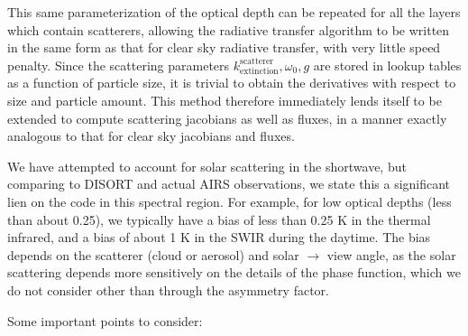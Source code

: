 \documentclass[11pt]{article}
\newcommand{\disort}{\textsf{DISORT}\xspace}
\begin{document}
This same parameterization of the optical depth can be repeated for
all the layers which contain scatterers, allowing the radiative
transfer algorithm to be written in the same form as that for clear
sky radiative transfer, with very little speed penalty. Since the
scattering parameters
$k^{\text{scatterer}}_{\text{extinction}},\omega_{0},g$ are stored in
lookup tables as a function of particle size, it is trivial to obtain
the derivatives with respect to size and particle amount. This method
therefore immediately lends itself to be extended to compute
scattering jacobians as well as fluxes, in a manner exactly analogous
to that for clear sky jacobians and fluxes.

We have attempted to account for solar scattering in the shortwave,
but comparing to \disort and actual AIRS observations, we state this a
significant lien on the code in this spectral region. For example, 
for low optical depths (less than about 0.25), we typically have a bias
of less than 0.25 K in the thermal infrared, and a bias of about 1 K 
in the SWIR during the daytime. The bias depends on the scatterer (cloud or
aerosol) and solar $\rightarrow$ view angle, as the solar scattering depends more sensitively
on the details of the phase function, which we do not consider other than 
through the asymmetry factor.

Some important points to consider:
\end{document}
